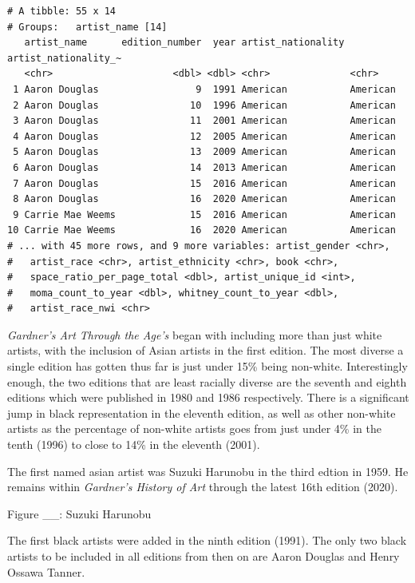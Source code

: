 \documentclass[
  letterpaper,
  DIV=11,
  numbers=noendperiod]{scrreprt}
\begin{document}
\begin{verbatim}
# A tibble: 55 x 14
# Groups:   artist_name [14]
   artist_name      edition_number  year artist_nationality artist_nationality_~
   <chr>                     <dbl> <dbl> <chr>              <chr>               
 1 Aaron Douglas                 9  1991 American           American            
 2 Aaron Douglas                10  1996 American           American            
 3 Aaron Douglas                11  2001 American           American            
 4 Aaron Douglas                12  2005 American           American            
 5 Aaron Douglas                13  2009 American           American            
 6 Aaron Douglas                14  2013 American           American            
 7 Aaron Douglas                15  2016 American           American            
 8 Aaron Douglas                16  2020 American           American            
 9 Carrie Mae Weems             15  2016 American           American            
10 Carrie Mae Weems             16  2020 American           American            
# ... with 45 more rows, and 9 more variables: artist_gender <chr>,
#   artist_race <chr>, artist_ethnicity <chr>, book <chr>,
#   space_ratio_per_page_total <dbl>, artist_unique_id <int>,
#   moma_count_to_year <dbl>, whitney_count_to_year <dbl>,
#   artist_race_nwi <chr>
\end{verbatim}

\emph{Gardner's Art Through the Age's} began with including more than
just white artists, with the inclusion of Asian artists in the first
edition. The most diverse a single edition has gotten thus far is just
under 15\% being non-white. Interestingly enough, the two editions that
are least racially diverse are the seventh and eighth editions which
were published in 1980 and 1986 respectively. There is a significant
jump in black representation in the eleventh edition, as well as other
non-white artists as the percentage of non-white artists goes from just
under 4\% in the tenth (1996) to close to 14\% in the eleventh (2001).

The first named asian artist was Suzuki Harunobu in the third edtion in
1959. He remains within \emph{Gardner's History of Art} through the
latest 16th edition (2020).

Figure \_\_: Suzuki Harunobu

The first black artists were added in the ninth edition (1991). The only
two black artists to be included in all editions from then on are Aaron
Douglas and Henry Ossawa Tanner.
\end{document}
